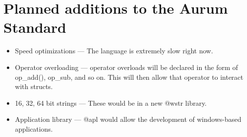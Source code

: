 \documentclass[12pt, letterpaper, oneside]{article}
\begin{document}
	\section{Planned additions to the Aurum Standard}
	\begin{itemize}
		\item[--] Speed optimizations --- The language is extremely slow right now.
		\item[--] Operator overloading --- operator overloads will be declared in the form of op\_add(), op\_sub, and so on. This will then allow that operator to interact with structs.
		\item[--] 16, 32, 64 bit strings --- These would be in a new @wstr library.
		\item[--] Application library --- @apl would allow the development of windows-based applications.
	\end{itemize}
	
	
	
	
	
	
	
\end{document}
